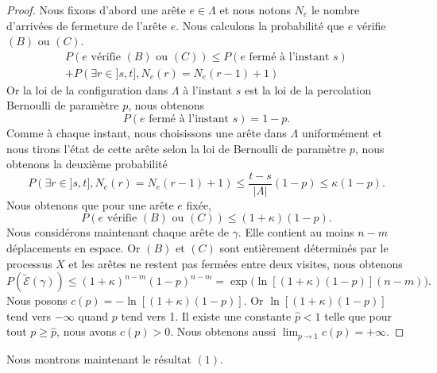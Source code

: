 \documentclass[titlepage,a4paper,12pt]{article}
\newcounter{th}
\begin{document}
\begin{proof}
Nous fixons d'abord une arête $e\in \Lambda$ et nous notons $N_e$ le nombre d'arrivées de fermeture de l'arête $e$. Nous calculons la probabilité que $e$ vérifie $(B)$ ou $(C)$.
\begin{multline*}P(e \text{ vérifie }(B) \text{ ou }(C))\leqslant P(e \text{ fermé à l'instant } s)\\+P(\exists r \in ]s,t], N_e(r)=N_e(r-1)+1)
\end{multline*}
Or la loi de la configuration dans $\Lambda$ à l'instant $s$ est la loi de la percolation Bernoulli de paramètre $p$, nous obtenons $$P(e \text{ fermé à l'instant } s) = 1-p.$$
Comme à chaque instant, nous choisissons une arête dans $\Lambda$ uniformément et nous tirons l'état de cette arête selon la loi de Bernoulli de paramètre $p$, nous obtenons la deuxième probabilité
$$ P(\exists r \in ]s,t], N_e(r)=N_e(r-1)+1) \leqslant \frac{t-s}{|\Lambda|}(1-p)\leqslant \kappa(1-p).
$$
Nous obtenons que pour une arête $e$ fixée, $$P(e \text{ vérifie }(B) \text{ ou }(C))\leqslant (1+\kappa)(1-p).$$
Nous considérons maintenant chaque arête de $\gamma$. Elle contient au moins $n-m$ déplacements en espace. Or $(B)$ et $(C)$ sont entièrement déterminés par le processus $X$ et les arêtes ne restent pas fermées entre deux visites, nous obtenons 
$$P(\tilde{\mathcal{E}}(\gamma))\leqslant (1+\kappa)^{n-m}(1-p)^{n-m} = \exp\big(\ln[(1+\kappa)(1-p)](n-m)\big).
$$ 
Nous posons $c(p) = -\ln[(1+\kappa)(1-p)]$. Or $\ln[(1+\kappa)(1-p)]$ tend vers $-\infty$ quand $p$ tend vers 1. Il existe une constante $\hat{p}<1$ telle que pour tout $p\geqslant \hat{p}$, nous avons $c(p)>0$. Nous obtenons aussi 
$ \lim_{p\rightarrow 1}c(p) = +\infty
$.
\end{proof}
Nous montrons maintenant le résultat $(1)$. 
\end{document}
